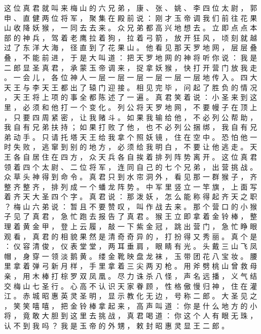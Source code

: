 {这 位 真 君 就 叫 来 梅 山 的 六 兄 弟 ， 康 、 张 、 姚 、 李 四 位 太 尉 ， 郭 申 、 直 健 两 位 将 军 ， 聚 集 在 殿 前 说 ： 刚 才 玉 帝 调 我 们 前 往 花 果 山 收 降 妖 猴 ， 一 同 去 去 来 。
众 兄 弟 都 高 兴 地 想 去 。
立 即 点 点 本 部 的 神 兵 ， 驾 着 老 鹰 拉 着 狗 ， 拉 着 弓 箭 ， 放 开 狂 风 ， 顷 刻 就 越 过 了 东 洋 大 海 ， 径 直 到 了 花 果 山 。
他 看 见 那 天 罗 地 网 ， 层 层 叠 叠 ， 不 能 前 进 ， 于 是 大 叫 道 ： 把 天 罗 地 网 的 神 将 听 你 说 ： 我 是 二 郎 显 圣 真 君 ， 承 蒙 玉 帝 调 来 ， 捉 拿 妖 猴 ， 快 打 开 营 门 放 我 走 。
一 会 儿 ， 各 位 神 人 一 层 一 层 一 层 一 层 一 层 一 层 地 传 入 。
四 大 天 王 与 李 天 王 都 出 了 辕 门 迎 接 。
相 见 完 毕 ， 问 起 了 胜 负 的 情 况 ， 天 王 将 上 项 的 事 全 都 陈 述 了 一 遍 。
真 君 笑 着 说 ： 小 圣 来 到 这 里 ， 必 须 和 他 打 一 个 变 化 。
列 公 将 天 罗 地 网 ， 不 要 幔 子 在 顶 上 ， 只 要 四 周 紧 密 ， 让 我 赌 斗 。
如 果 我 输 给 他 ， 不 必 列 公 帮 助 ， 我 自 有 兄 弟 扶 持 ； 如 果 打 败 了 他 ， 也 不 必 列 公 捆 绑 ， 我 自 有 兄 弟 动 手 。
只 请 托 塔 天 王 给 我 拿 个 照 妖 镜 ， 住 在 空 中 。
恐 怕 他 一 时 失 败 ， 逃 窜 到 别 的 地 方 ， 必 须 给 我 明 白 ， 不 要 让 他 逃 走 。
天 王 各 自 居 住 在 四 方 ， 众 天 兵 各 自 挨 着 排 列 阵 势 离 开 。
这 位 真 君 领 着 四 个 太 尉 、 二 位 将 军 ， 连 同 自 己 的 七 个 兄 弟 ， 出 营 挑 战 。
众 草 头 神 得 到 命 令 。
真 君 只 到 水 帘 洞 外 ， 看 见 那 一 群 猴 子 ， 齐 整 齐 整 齐 ， 排 列 成 一 个 蟠 龙 阵 势 。
中 军 里 竖 立 一 竿 旗 ， 上 面 写 着 齐 天 大 圣 四 个 字 。
真 君 说 ： 那 泼 妖 ， 怎 么 能 称 得 起 齐 天 之 职 ？ 梅 山 六 弟 说 ： 暂 且 不 要 赞 叹 ， 叫 作 战 去 来 。
那 个 营 口 的 小 猴 子 见 了 真 君 ， 急 忙 跑 去 报 告 了 真 君 。
猴 王 立 即 拿 着 金 铃 棒 ， 整 理 着 黄 金 甲 ， 登 上 云 履 ， 敲 一 下 紫 金 冠 ， 跳 出 营 门 ， 急 忙 睁 眼 观 看 ， 真 君 的 相 貌 果 然 是 清 奇 奇 异 的 ， 打 扮 得 又 秀 丽 。
真 个 是 ： 仪 容 清 俊 ， 仪 表 堂 堂 ， 两 耳 垂 肩 ， 眼 睛 有 光 。
头 戴 三 山 飞 凤 帽 ， 身 穿 一 领 淡 鹅 黄 。
缕 金 靴 映 盘 龙 袜 ， 玉 带 团 花 八 宝 妆 。
腰 里 拿 着 弹 弓 新 月 样 ， 手 里 拿 着 三 尖 两 刃 枪 。
用 斧 劈 桃 山 曾 救 母 亲 ， 用 木 棒 打 棕 罗 双 凤 凰 。
尽 力 诛 杀 八 怪 ， 声 名 远 播 ， 义 气 结 交 梅 山 七 圣 行 。
心 高 不 认 识 天 家 眷 顾 ， 性 格 傲 慢 归 神 ， 住 在 灌 江 。
赤 城 昭 惠 英 灵 圣 明 ， 显 示 教 化 无 边 ， 号 称 二 郎 。
大 圣 见 之 ， 笑 笑 嘻 嘻 ， 把 金 铃 棒 拿 起 来 ， 高 声 叫 道 ： 你 是 什 么 地 方 的 小 将 ， 竟 敢 大 胆 到 这 里 去 挑 战 ， 真 君 喝 道 ： 你 这 个 人 有 眼 无 珠 ， 认 不 到 我 吗 ？ 我 是 玉 帝 的 外 甥 ， 敕 封 昭 惠 灵 显 王 二 郎 。
}
